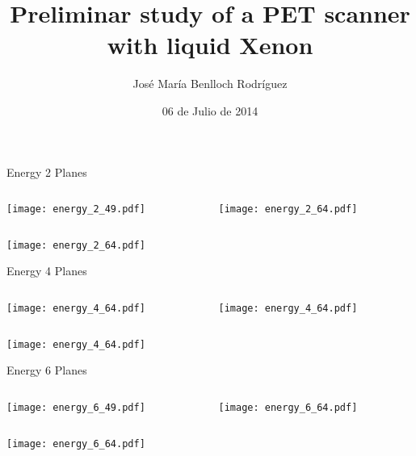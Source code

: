 \documentclass{beamer}
\title{Preliminar study of a PET scanner with liquid Xenon}
\author[José María Benlloch Rodríguez]{José María Benlloch Rodríguez}
\institute{NEXT Collaboration}
\date{06 de Julio de 2014}
\begin{document}
\begin{frame}
  \titlepage
\end{frame}

\begin{frame}{Energy 2 Planes}
	\begin{columns}[onlytextwidth]
		\begin{column}{0.5\textwidth}
			\texttt{[image: energy\_2\_49.pdf]}
		 \end{column}
		 \begin{column}{0.5\textwidth}
			\texttt{[image: energy\_2\_64.pdf]}
		 \end{column}
 \end{columns}
 		\begin{center} {\texttt{[image: energy\_2\_64.pdf]}} \end{center}
\end{frame}

\begin{frame}{Energy 4 Planes}
	\begin{columns}[onlytextwidth]
		\begin{column}{0.5\textwidth}
			\texttt{[image: energy\_4\_64.pdf]}
		 \end{column}
		 \begin{column}{0.5\textwidth}
			\texttt{[image: energy\_4\_64.pdf]}
		 \end{column}
 \end{columns}
 		\begin{center} {\texttt{[image: energy\_4\_64.pdf]}} \end{center}
\end{frame}

\begin{frame}{Energy 6 Planes}
	\begin{columns}[onlytextwidth]
		\begin{column}{0.5\textwidth}
			\texttt{[image: energy\_6\_49.pdf]}
		 \end{column}
		 \begin{column}{0.5\textwidth}
			\texttt{[image: energy\_6\_64.pdf]}
		 \end{column}
 \end{columns}
 		\begin{center} {\texttt{[image: energy\_6\_64.pdf]}} \end{center}
\end{frame}
\end{document}
